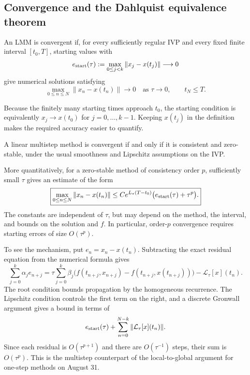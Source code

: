 \subsection{Convergence and the Dahlquist equivalence theorem}

\begin{definition}
 An LMM is convergent if, for every sufficiently regular IVP and
 every fixed finite interval \([t_0,T]\), starting values with
 \[
  e_{\rm start}(\tau)
   :=\max_{0\leq j<k}\|x_j-x(t_j)\|\longrightarrow0
 \]
 give numerical solutions satisfying
 \[
  \max_{0\leq n\leq N}\|x_n-x(t_n)\|\longrightarrow0
  \quad\text{as }\tau\to0,\qquad t_N\leq T.
 \]
\end{definition}

Because the finitely many starting times approach \(t_0\), the
starting condition is equivalently \(x_j\to x(t_0)\) for
\(j=0,\ldots,k-1\). Keeping \(x(t_j)\) in the definition makes
the required accuracy easier to quantify.

\begin{theorem}[Dahlquist]
 A linear multistep method is convergent if and only if it is
 consistent and zero-stable, under the usual smoothness and
 Lipschitz assumptions on the IVP.
\end{theorem}

More quantitatively, for a zero-stable method of consistency order
\(p\), sufficiently small \(\tau\) gives an estimate of the form
\begin{equation}\label{eq:lmm-global-bound-oct-07}
 \boxed{\max_{0\leq n\leq N}\|x_n-x(t_n)\|
  \leq C e^{L_*(T-t_0)}
          \bigl(e_{\rm start}(\tau)+\tau^p\bigr).}
\end{equation}
The constants are independent of \(\tau\), but may depend on
the method, the interval, and bounds on the solution and \(f\).
In particular, order-\(p\) convergence requires starting errors
of size \(O(\tau^p)\).

To see the mechanism, put \(e_n=x_n-x(t_n)\). Subtracting the
exact residual equation from the numerical formula gives
\begin{equation}\label{eq:lmm-error-recursion-oct-07}
 \sum_{j=0}^k\alpha_je_{n+j}
 =\tau\sum_{j=0}^k\beta_j
       \bigl(f(t_{n+j},x_{n+j})-f(t_{n+j},x(t_{n+j}))\bigr)
       -\mathcal L_\tau[x](t_n).
\end{equation}
The root condition bounds propagation by the homogeneous recurrence.
The Lipschitz condition controls the first term on the right, and
a discrete Gronwall argument gives a bound in terms of
\[
 e_{\rm start}(\tau)
       +\sum_{n=0}^{N-k}\|\mathcal L_\tau[x](t_n)\|.
\]
Since each residual is \(O(\tau^{p+1})\) and there are
\(O(\tau^{-1})\) steps, their sum is \(O(\tau^p)\).
This is the multistep counterpart of the local-to-global argument
for one-step methods on August 31.

